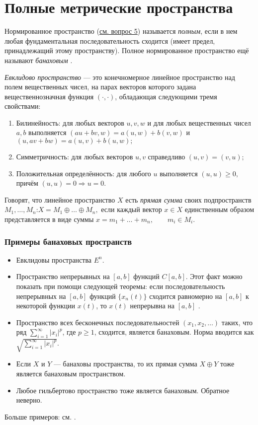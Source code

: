 \section{Полные метрические пространства}
\label{sec:q-2}
Нормированное пространство (\hyperref[sec:q-5]{см. вопрос 5}) называется \textit{полным}, если в нем любая фундаментальная последовательность сходится (имеет предел, принадлежащий этому пространству). Полное нормированное пространство ещё называют \textit{банаховым} \cite[с.~42]{trenogin}.

\textit{Евклидово пространство} --- это конечномерное линейное пространство над полем вещественных чисел, на парах векторов которого задана вещественнозначная функция $(\cdot, \cdot)$, обладающая следующими тремя свойствами:
\begin{enumerate}
	\itemsep0pt
	\item Билинейность: для любых векторов $u,v,w$ и для любых вещественных чисел $a, b$ выполняется $(au+bv, w)=a(u,w)+b(v,w)$ и $(u, av+bw)=a(u,v)+b(u,w);$
	\item Симметричность: для любых векторов $u,v$ справедливо $(u,v)=(v,u);$
	\item Положительная определённость: для любого $u$ выполняется $ (u,u)\geqslant 0,$ причём $(u,u) = 0\Rightarrow u=0.$
\end{enumerate}

Говорят, что линейное пространство $X$ есть \textit{прямая сумма} своих подпространств $M_1, \dots, M_n$:$X = M_1 \oplus \dots \oplus M_n,$ если каждый вектор $x \in X$ единственным образом представляется в виде суммы
$x = m_1 + \dots + m_n, \qquad m_i \in M_i.$


\subsubsection*{Примеры банаховых пространств}
\begin{itemize}
	\itemsep0pt
	\item Евклидовы пространства $E^n$.
	\item Пространство непрерывных на $[a, b]$ функций $C[a, b]$. Этот факт можно показать при помощи следующей теоремы: если последовательность непрерывных на $[a, b]$ функций $\{x_n(t)\}$ сходится равномерно на $[a, b]$ к некоторой функции $x(t)$, то $x(t)$ непрерывна на $[a, b]$ \cite[с.~43]{trenogin}.
	\item Пространство всех бесконечных последовательностей $(x_1, x_2, \dots)$ таких, что ряд $ \sum_{i = 1}^{\infty}|x_i|^p$, где $p \geqslant 1$, сходится, является банаховым. Норма вводится как $ \sqrt{\sum_{i = 1}^{\infty}|x_i|^p}$.
	\item Если $X$ и $Y$ --- банаховы пространства, то их прямая сумма $X \oplus Y$ тоже является банаховым пространством.
	\item Любое гильбертово пространство тоже является банаховым. Обратное неверно.
\end{itemize}
Больше примеров: см. \cite{wiki-banach-space}.